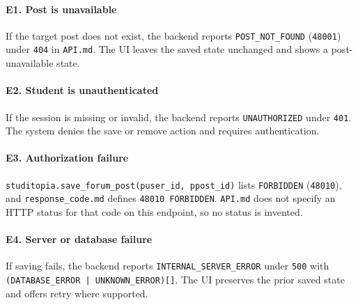 \documentclass[12pt]{article}
\begin{document}
\hypertarget{sec:e1-post-is-unavailable}{}
\paragraph*{E1. Post is unavailable}
\par\medskip

If the target post does not exist, the backend reports \texttt{POST\_NOT\_FOUND} (\texttt{48001}) under \texttt{404} in \texttt{API.md}. The UI leaves the saved state unchanged and shows a post-unavailable state.
\par\medskip

\hypertarget{sec:e2-student-is-unauthenticated}{}
\paragraph*{E2. Student is unauthenticated}
\par\medskip

If the session is missing or invalid, the backend reports \texttt{UNAUTHORIZED} under \texttt{401}. The system denies the save or remove action and requires authentication.
\par\medskip

\hypertarget{sec:e3-authorization-failure}{}
\paragraph*{E3. Authorization failure}
\par\medskip

\texttt{studitopia.save\_forum\_post(puser\_id, ppost\_id)} lists \texttt{FORBIDDEN} (\texttt{48010}), and \texttt{response\_code.md} defines \texttt{48010 FORBIDDEN}. \texttt{API.md} does not specify an HTTP status for that code on this endpoint, so no status is invented.
\par\medskip

\hypertarget{sec:e4-server-or-database-failure}{}
\paragraph*{E4. Server or database failure}
\par\medskip

If saving fails, the backend reports \texttt{INTERNAL\_SERVER\_ERROR} under \texttt{500} with \texttt{(DATABASE\_ERROR | UNKNOWN\_ERROR)[]}. The UI preserves the prior saved state and offers retry where supported.
\par\medskip
\end{document}
